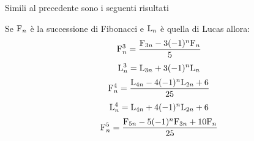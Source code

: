 Simili al precedente sono  i seguenti risultati
\begin{thm}\label{thm:FibpotSommadue}
Se $\mathrm{F}_{n}$ è la successione di Fibonacci e  $\mathrm{L}_{n}$ è quella di Lucas allora:
\begin{equation}
	\mathrm{F}_{n}^3=\dfrac{\mathrm{F}_{3n}-3(-1)^n\mathrm{F}_{n}}{5}
\end{equation}\label{eqn:FibCubSomma}
\begin{equation}
	\mathrm{L}_{n}^3=\mathrm{L}_{3n}+3(-1)^n\mathrm{L}_{n}
\end{equation}\label{eqn:LucCubSomma}
\begin{equation}
	\mathrm{F}_{n}^4=\dfrac{\mathrm{L}_{4n}-4(-1)^n\mathrm{L}_{2n}+6}{25}
\end{equation}\label{eqn:FibQuartaSomma}
\begin{equation}
	\mathrm{L}_{n}^4=\mathrm{L}_{4n}+4(-1)^n\mathrm{L}_{2n}+6
\end{equation}\label{eqn:LucQuartaSomma}
\begin{equation}
	\mathrm{F}_{n}^5=\dfrac{\mathrm{F}_{5n}-5(-1)^n\mathrm{F}_{3n}+10\mathrm{F}_{n}}{25}
\end{equation}\label{eqn:FibQuintaaSomma}
\end{thm}
